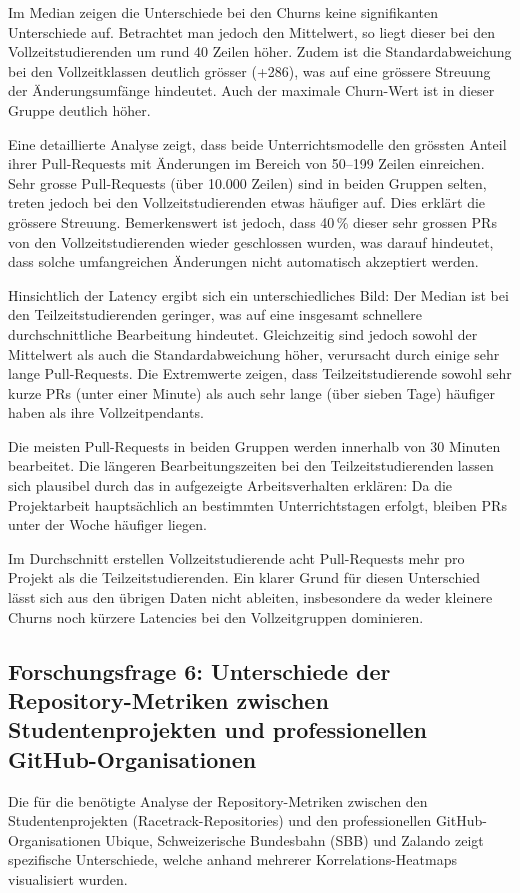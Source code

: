 Im Median zeigen die Unterschiede bei den Churns keine signifikanten Unterschiede auf. Betrachtet man jedoch den Mittelwert, so liegt dieser bei den Vollzeitstudierenden um rund 40 Zeilen höher. Zudem ist die Standardabweichung bei den Vollzeitklassen deutlich grösser (+286), was auf eine grössere Streuung der Änderungsumfänge hindeutet. Auch der maximale Churn-Wert ist in dieser Gruppe deutlich höher. 

Eine detaillierte Analyse zeigt, dass beide Unterrichtsmodelle den grössten Anteil ihrer Pull-Requests mit Änderungen im Bereich von 50–199 Zeilen einreichen. Sehr grosse Pull-Requests (über 10.000 Zeilen) sind in beiden Gruppen selten, treten jedoch bei den Vollzeitstudierenden etwas häufiger auf. Dies erklärt die grössere Streuung. Bemerkenswert ist jedoch, dass 40\,\% dieser sehr grossen PRs von den Vollzeitstudierenden wieder geschlossen wurden, was darauf hindeutet, dass solche umfangreichen Änderungen nicht automatisch akzeptiert werden.


Hinsichtlich der Latency ergibt sich ein unterschiedliches Bild: Der Median ist bei den Teilzeitstudierenden geringer, was auf eine insgesamt schnellere durchschnittliche Bearbeitung hindeutet. Gleichzeitig sind jedoch sowohl der Mittelwert als auch die Standardabweichung höher, verursacht durch einige sehr lange Pull-Requests. Die Extremwerte zeigen, dass Teilzeitstudierende sowohl sehr kurze PRs (unter einer Minute) als auch sehr lange (über sieben Tage) häufiger haben als ihre Vollzeitpendants.

Die meisten Pull-Requests in beiden Gruppen werden innerhalb von 30 Minuten bearbeitet. Die längeren Bearbeitungszeiten bei den Teilzeitstudierenden lassen sich plausibel durch das in  aufgezeigte Arbeitsverhalten erklären: Da die Projektarbeit hauptsächlich an bestimmten Unterrichtstagen erfolgt, bleiben PRs unter der Woche häufiger liegen.

Im Durchschnitt erstellen Vollzeitstudierende acht Pull-Requests mehr pro Projekt als die Teilzeitstudierenden. Ein klarer Grund für diesen Unterschied lässt sich aus den übrigen Daten nicht ableiten, insbesondere da weder kleinere Churns noch kürzere Latencies bei den Vollzeitgruppen dominieren. 

\subsection{Forschungsfrage 6: Unterschiede der Repository-Metri\-ken zwischen Studentenprojekten und professionellen GitHub-Or\-ganisationen}
Die für die  benötigte Analyse der Repository-Metriken zwischen den Studentenprojekten (Racetrack-Repositories) und den professionellen GitHub-Organisationen Ubique, Schweizerische Bundesbahn (SBB) und Zalando zeigt spezifische Unterschiede, welche anhand mehrerer Korrelations-Heatmaps visualisiert wurden. 

